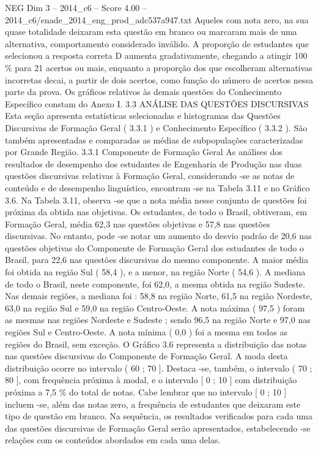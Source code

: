 \begin{textsample}{NEG Dim 3 – 2014\_c6 – Score 4.00 – 2014\_c6/enade\_2014\_eng\_prod\_adc537a947.txt}
Aqueles com nota zero, na sua quase totalidade deixaram esta questão em branco ou marcaram mais de uma alternativa, comportamento considerado inválido.
A proporção de estudantes que selecionou a resposta correta D aumenta gradativamente, chegando a atingir 100 \% para 21 acertos ou mais, enquanto a proporção dos que escolheram alternativas incorretas decai, a partir de dois acertos, como função do número de acertos nessa parte da prova.
Os gráficos relativos às demais questões do Conhecimento Específico constam do Anexo I. 3.3 ANÁLISE DAS QUESTÕES DISCURSIVAS Esta seção apresenta estatísticas selecionadas e histogramas das Questões Discursivas de Formação Geral ( 3.3.1 ) e Conhecimento Específico ( 3.3.2 ).
São também apresentadas e comparadas as médias de subpopulações caracterizadas por Grande Região. 3.3.1 Componente de Formação Geral As análises dos resultados de desempenho dos estudantes de Engenharia de Produção nas duas questões discursivas relativas à Formação Geral, considerando -se as notas de conteúdo e de desempenho linguístico, encontram -se na Tabela 3.11 e no Gráfico 3.6.
Na Tabela 3.11, observa -se que a nota média nesse conjunto de questões foi próxima da obtida nas objetivas.
Os estudantes, de todo o Brasil, obtiveram, em Formação Geral, média 62,3 nas questões objetivas e 57,8 nas questões discursivas.
No entanto, pode -se notar um aumento do desvio padrão de 20,6 nas questões objetivas do Componente de Formação Geral dos estudantes de todo o Brasil, para 22,6 nas questões discursivas do mesmo componente.
A maior média foi obtida na região Sul ( 58,4 ), e a menor, na região Norte ( 54,6 ).
A mediana de todo o Brasil, neste componente, foi 62,0, a mesma obtida na região Sudeste.
Nas demais regiões, a mediana foi : 58,8 na região Norte, 61,5 na região Nordeste, 63,0 na região Sul e 59,0 na região Centro-Oeste.
A nota máxima ( 97,5 ) foram as mesmas nas regiões Nordeste e Sudeste ; sendo 96,5 na região Norte e 97,0 nas regiões Sul e Centro-Oeste.
A nota mínima ( 0,0 ) foi a mesma em todas as regiões do Brasil, sem exceção.
O Gráfico 3.6 representa a distribuição das notas nas questões discursivas do Componente de Formação Geral.
A moda desta distribuição ocorre no intervalo ( 60 ; 70 ].
Destaca -se, também, o intervalo ( 70 ; 80 ], com frequência próxima à modal, e o intervalo [ 0 ; 10 ] com distribuição próxima a 7,5 \% do total de notas.
Cabe lembrar que no intervalo [ 0 ; 10 ] incluem -se, além das notas zero, a frequência de estudantes que deixaram este tipo de questão em branco.
Na sequência, os resultados verificados para cada uma das questões discursivas de Formação Geral serão apresentados, estabelecendo -se relações com os conteúdos abordados em cada uma delas.

\end{textsample}
